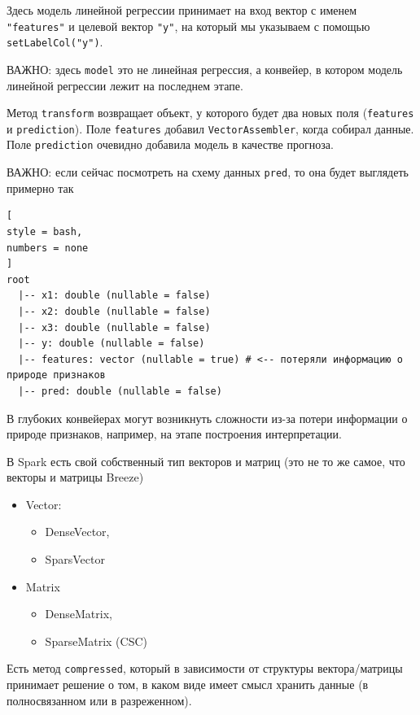 \documentclass[%
	11pt,
	a4paper,
	utf8,
		]{article}
\begin{document}
Здесь модель линейной регрессии принимает на вход вектор с именем \texttt{"features"} и целевой вектор \texttt{"y"}, на который мы указываем с помощью \texttt{setLabelCol("y")}.

ВАЖНО: здесь \texttt{model} это не линейная регрессия, а конвейер, в котором модель линейной регрессии лежит на последнем этапе.

Метод \texttt{transform} возвращает объект, у которого будет два новых поля (\texttt{features} и \texttt{prediction}). Поле \texttt{features} добавил \texttt{VectorAssembler}, когда собирал данные. Поле \texttt{prediction} очевидно добавила модель в качестве прогноза.

ВАЖНО: если сейчас посмотреть на схему данных \texttt{pred}, то она будет выглядеть примерно так
\begin{lstlisting}[
style = bash,
numbers = none
]
root
  |-- x1: double (nullable = false)
  |-- x2: double (nullable = false)
  |-- x3: double (nullable = false)
  |-- y: double (nullable = false)
  |-- features: vector (nullable = true) # <-- потеряли информацию о природе признаков
  |-- pred: double (nullable = false)
\end{lstlisting}

В глубоких конвейерах могут возникнуть сложности из-за потери информации о природе признаков, например, на этапе построения интерпретации. 

В Spark есть свой собственный тип векторов и матриц (это не то же самое, что векторы и матрицы Breeze)
\begin{itemize}
	\item Vector:
	\begin{itemize}
		\item DenseVector,
		
		\item SparsVector
	\end{itemize}

    \item Matrix
    \begin{itemize}
    	\item DenseMatrix,
    	
    	\item SparseMatrix (CSC)
    \end{itemize}
\end{itemize}

Есть метод \texttt{compressed}, который в зависимости от структуры вектора/матрицы принимает решение о том, в каком виде имеет смысл хранить данные (в полносвязанном или в разреженном).
\end{document}
